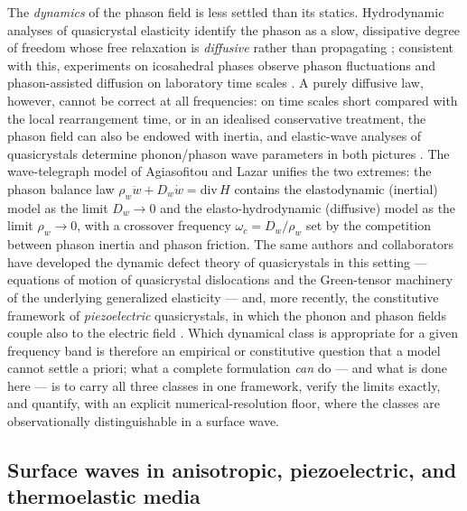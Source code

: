 \documentclass[11pt]{article}
\newcommand{\om}{\omega}
\newcommand{\Dw}{D_w}
\newcommand{\rw}{\rho_w}
\begin{document}
The \emph{dynamics} of the phason field is less settled than its statics. Hydrodynamic analyses of quasicrystal elasticity identify the phason as a slow, dissipative degree of freedom whose free relaxation is \emph{diffusive} rather than propagating \cite{lubensky1985,socolar1986}; consistent with this, experiments on icosahedral phases observe phason fluctuations and phason-assisted diffusion on laboratory time scales \cite{deboissieu2012,francoual2003}. A purely diffusive law, however, cannot be correct at all frequencies: on time scales short compared with the local rearrangement time, or in an idealised conservative treatment, the phason field can also be endowed with inertia, and elastic-wave analyses of quasicrystals determine phonon/phason wave parameters in both pictures \cite{chellappan2015}. The wave-telegraph model of Agiasofitou and Lazar \cite{agiasofitou2014} unifies the two extremes: the phason balance law $\rw\ddot w+\Dw\dot w=\mathrm{div}\,H$ contains the elastodynamic (inertial) model as the limit $\Dw\to0$ and the elasto-hydrodynamic (diffusive) model as the limit $\rw\to0$, with a crossover frequency $\om_c=\Dw/\rw$ set by the competition between phason inertia and phason friction. The same authors and collaborators have developed the dynamic defect theory of quasicrystals in this setting --- equations of motion of quasicrystal dislocations \cite{agiasofitou2014mrc} and the Green-tensor machinery of the underlying generalized elasticity \cite{lazar2014pm} --- and, more recently, the constitutive framework of \emph{piezoelectric} quasicrystals, in which the phonon and phason fields couple also to the electric field \cite{agiasofitou2023}. Which dynamical class is appropriate for a given frequency band is therefore an empirical or constitutive question that a model cannot settle a priori; what a complete formulation \emph{can} do --- and what is done here --- is to carry all three classes in one framework, verify the limits exactly, and quantify, with an explicit numerical-resolution floor, where the classes are observationally distinguishable in a surface wave.

\subsection{Surface waves in anisotropic, piezoelectric, and thermoelastic media}
\end{document}
